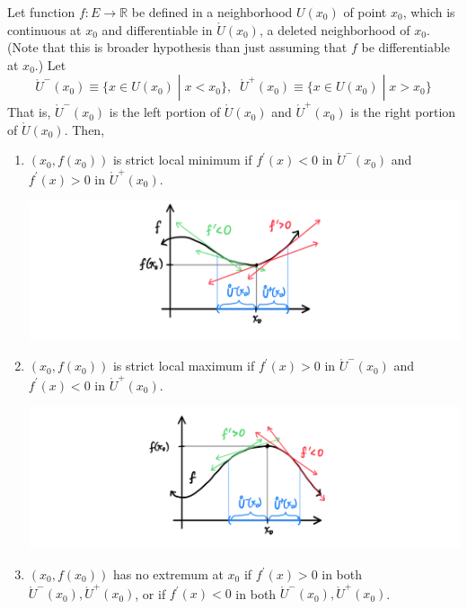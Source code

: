     \begin{theorem}
    Let function $f: E \longrightarrow \mathbb{R}$ be defined in a neighborhood $U(x_0)$ of point $x_0$, which is continuous at $x_0$ and differentiable in $\mathring{U}(x_0)$, a deleted neighborhood of $x_0$. (Note that this is broader hypothesis than just assuming that $f$ be differentiable at $x_0$.) Let
    \[\mathring{U}^- (x_0) \equiv \{x \in U(x_0) \;|\; x < x_0\}, \;\; \mathring{U}^+ (x_0) \equiv \{x \in U(x_0) \;|\; x > x_0\}\]
    That is, $\mathring{U}^- (x_0)$ is the left portion of $\mathring{U}(x_0)$ and $\mathring{U}^+ (x_0)$ is the right portion of $\mathring{U}(x_0)$. Then, 
    \begin{enumerate}
      \item $(x_0, f(x_0))$ is strict local minimum if $f^\prime(x) < 0$ in $\mathring{U}^- (x_0)$ and $f^\prime (x) > 0$ in $\mathring{U}^+ (x_0)$. 
      \begin{center}
          \includegraphics[scale=0.25]{img/Strict_Local_minimum.PNG}
      \end{center}
      \item $(x_0, f(x_0))$ is strict local maximum if $f^\prime(x) > 0$ in $\mathring{U}^- (x_0)$ and $f^\prime (x) < 0$ in $\mathring{U}^+ (x_0)$. 
      \begin{center}
          \includegraphics[scale=0.25]{img/Strict_Local_Maximum.PNG}
      \end{center}
      \item $(x_0, f(x_0))$ has no extremum at $x_0$ if $f^\prime (x) > 0$ in both $\mathring{U}^- (x_0), \mathring{U}^+ (x_0)$, or if $f^\prime(x)< 0$ in both $\mathring{U}^- (x_0), \mathring{U}^+ (x_0)$. 

\end{enumerate}
\end{theorem}
